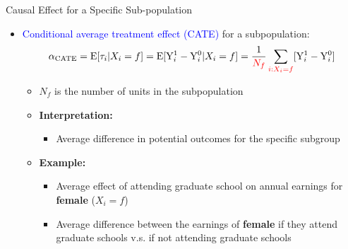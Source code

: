 \documentclass[hyperref={pdfpagelabels=false}]{beamer}
\begin{document}
\begin{frame}{Causal Effect for a Specific Sub-population}
\begin{itemize}
\item \textcolor{blue} {Conditional average treatment effect (CATE)} for a subpopulation:
\begin{equation*}
\alpha_{\text{CATE}} = \mathrm{E}[\tau_i|X_i=f] = \mathrm{E}[\mathrm{Y}^{1}_{i}-\mathrm{Y}^{0}_{i}|X_i=f] = \dfrac{1}{\color{red}N_f} \sum_{\color{red}i:X_i=f}[\mathrm{Y}^{1}_{i}-\mathrm{Y}^{0}_{i}]
\end{equation*}

\begin{itemize}
\item $N_f$ is the number of units in the subpopulation
\vspace{0.2cm}
\item \textbf{Interpretation:} 
\vspace{0.2cm}
\begin{itemize}
\item Average difference in potential outcomes for the specific subgroup
\vspace{0.2cm}
\end{itemize}
\item \textbf{Example:}
\vspace{0.2cm}
\begin{itemize} 

	\item Average effect of attending graduate school on annual earnings for \textbf{female} ($X_{i}=f$)
	\vspace{0.2cm}
\item  Average difference between the earnings of \textbf{female} if they attend graduate schools v.s. if not attending graduate schools
\end{itemize}


\end{itemize}


\end{itemize}


\end{frame}
\end{document}
